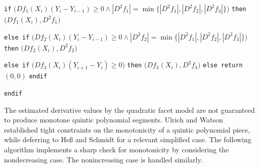 \begin{plain}
{\itemitem{} {\tt if} $\bigl(Df_1(X_i)(Y_i-Y_{i-1}) \ge 0 \wedge
  |D^2f_1| = \min\bigl\{ |D^2f_1|,
  |D^2f_2|, |D^2f_3|\bigr\} \bigr)$ {\tt then}
\itemitem{}  $\bigl(Df_1(X_i),D^2f_1\bigr)$

\itemitem{} {\tt else if} $\bigl(Df_2(X_i)(Y_i-Y_{i-1}) \ge 0 \wedge
  |D^2f_2| = \min\bigl\{ |D^2f_1|,
  |D^2f_2|, |D^2f_3|\bigr\} \bigr)$ {\tt then}
\itemitem{}  $\bigl(Df_2(X_i),D^2f_2\bigr)$

\itemitem{} {\tt else if} $\bigl(Df_3(X_i)(Y_{i+1}-Y_i) \ge 0\bigr)$ {\tt then}
\itemitem{}  $\bigl(Df_3(X_i),D^2f_3\bigr)$
\itemitem{} {\tt else return} $(0, 0)$
\itemitem{} {\tt endif}
\item{} {\tt endif}
}
\vskip 5mm
\end{plain}

The estimated derivative values by the quadratic facet model are not
guaranteed to produce monotone quintic polynomial segments. Ulrich and
Watson \cite{ulrich1994positivity} established tight constraints on the monotonicity of a
quintic polynomial piece, while deferring to He{\ss} and Schmidt
\cite{hess1994positive} for a relevant simplified case. The following algorithm
implements a sharp check for monotonicity by considering the
nondecreasing case. The nonincreasing case is handled similarly.

